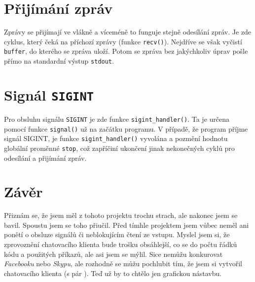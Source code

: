 \documentclass[a4paper, 11pt]{article}
\begin{document}
\section{Přijímání zpráv}\label{recv}

Zprávy se přijímají ve vlákně a víceméně to funguje stejně odesílání zpráv. Je zde cyklus, který čeká na příchozí zprávy (funkce \texttt{recv()}). Nejdříve se však vyčistí \texttt{buffer}, do kterého se zpráva uloží. Potom se zpráva bez jakýchkoliv úprav pošle přímo na standardní výstup \texttt{stdout}.

\section{Signál \texttt{SIGINT}}

Pro obsluhu signálu \texttt{SIGINT} je zde funkce \texttt{sigint\_handler()}. Ta je určena pomocí funkce \texttt{signal()} už na začátku programu. V případě, že program příjme signál SIGINT, je funkce \texttt{sigint\_handler()} vyvolána a pozmění hodnotu globální proměnné \texttt{stop}, což zapříčiní ukončení jinak nekonečných cyklů pro odesílání a přijímání zpráv.

\section*{Závěr}

Přiznám se, že jsem měl z tohoto projektu trochu strach, ale nakonec jsem se bavil. Spoustu jsem se toho přiučil. Před tímhle projektem jsem vůbec neměl ani ponětí o obsluze signálů či neblokujícím čtení ze vstupu. Myslel jsem si, že zprovoznění chatovacího klienta bude trošku obsáhlejší, co se do počtu řádků kódu a použitých příkazů, ale asi jsem se mýlil. Sice nemůžu konkurovat \textit{Facebooku} nebo \textit{Skypu}, ale rozhodně se můžu pochlubit tím, že jsem si vytvořil chatovacího klienta (s pár ). Teď už by to chtělo jen grafickou nástavbu.
\end{document}
